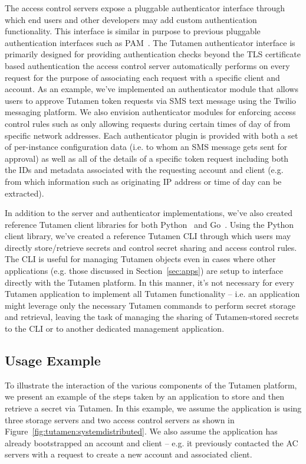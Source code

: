 The access control servers expose a pluggable authenticator interface
through which end users and other developers may add custom
authentication functionality. This interface is similar in purpose to
previous pluggable authentication interfaces such as
PAM~\cite{samar1996}. The Tutamen authenticator interface is primarily
designed for providing authentication checks beyond the TLS
certificate based authentication the access control server
automatically performs on every request for the purpose of associating
each request with a specific client and account. As an example, we've
implemented an authenticator module that allows users to approve
Tutamen token requests via SMS text message using the
Twilio~\cite{twilio} messaging platform. We also envision
authenticator modules for enforcing access control rules such as only
allowing requests during certain times of day of from specific network
addresses. Each authenticator plugin is provided with both a set of
per-instance configuration data (i.e. to whom an SMS message gets sent
for approval) as well as all of the details of a specific token
request including both the IDs and metadata associated with the
requesting account and client (e.g. from which information such as
originating IP address or time of day can be extracted).

In addition to the server and authenticator implementations, we've
also created reference Tutamen client libraries for both
Python~\cite{src-tutamen-pytutamen} and
Go~\cite{src-tutamen-go}. Using the Python client library, we've
created a reference Tutamen CLI through which users may directly
store/retrieve secrets and control secret sharing and access control
rules. The CLI is useful for managing Tutamen objects even in cases
where other applications (e.g. those discussed in
Section~\ref{sec:apps}) are setup to interface directly with the
Tutamen platform. In this manner, it's not necessary for every Tutamen
application to implement all Tutamen functionality -- i.e. an
application might leverage only the necessary Tutamen commands to
perform secret storage and retrieval, leaving the task of managing the
sharing of Tutamen-stored secrets to the CLI or to another dedicated
management application.

\subsection{Usage Example}

To illustrate the interaction of the various components of the Tutamen
platform, we present an example of the steps taken by an application
to store and then retrieve a secret via Tutamen. In this example, we
assume the application is using three storage servers and two access
control servers as shown in
Figure~\ref{fig:tutamen:systemdistributed}. We also assume the
application has already bootstrapped an account and client -- e.g. it
previously contacted the AC servers with a request to create a new
account and associated client.

